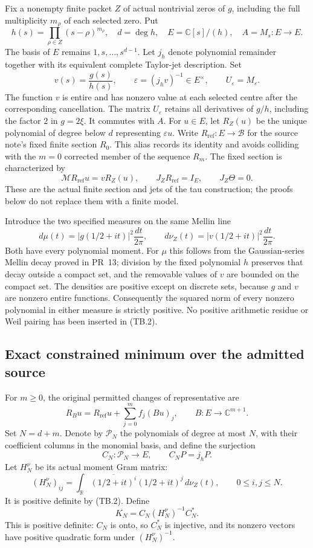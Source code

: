 Fix a nonempty finite packet \(Z\) of actual nontrivial zeros of \(g\),
including the full multiplicity \(m_\rho\) of each selected zero.  Put
\[
 h(s)=\prod_{\rho\in Z}(s-\rho)^{m_\rho},\quad
 d=\deg h,\quad E=\mathbb C[s]/(h),\quad A=M_s:E\longrightarrow E.
\]
The basis of \(E\) remains \(1,s,\ldots,s^{d-1}\).
Let \(j_h\) denote polynomial remainder together with its equivalent
complete Taylor-jet description.  Set
\[
 v(s)=\frac{g(s)}{h(s)},\qquad
 \varepsilon=(j_hv)^{-1}\in E^\times,\qquad U_\varepsilon=M_\varepsilon.
\]
The function \(v\) is entire and has nonzero value at each selected
centre after the corresponding cancellation.  The matrix
\(U_\varepsilon\) retains all derivatives of \(g/h\), including the
factor \(2\) in \(g=2\xi\).  It commutes with \(A\).
For \(u\in E\), let \(R_Z(u)\) be the unique polynomial of degree below
\(d\) representing \(\varepsilon u\).
Write \(R_{\mathrm{ref}}:E\to\mathscr B\) for the source note's
fixed finite section \(R_0\).  This alias records its identity
and avoids colliding with the \(m=0\) corrected member of the
sequence \(R_m\).  The fixed section is characterized by
\[
 \mathcal M R_{\mathrm{ref}}u=vR_Z(u),\qquad
 J_ZR_{\mathrm{ref}}=I_E,\qquad J_Z\Theta=0.
 \tag{TB.1}
\]
These are the actual finite section and jets of the tau construction;
the proofs below do not replace them with a finite model.

Introduce the two specified measures on the same Mellin line
\[
 d\mu(t)=|g(1/2+it)|^2\frac{dt}{2\pi},\qquad
 d\nu_Z(t)=|v(1/2+it)|^2\frac{dt}{2\pi}.
 \tag{TB.2}
\]
Both have every polynomial moment.  For \(\mu\) this follows from
the Gaussian-series Mellin decay proved in PR~13; division by the
fixed polynomial \(h\) preserves that decay outside a compact set,
and the removable values of \(v\) are bounded on the compact set.
The densities are positive except on discrete sets, because \(g\)
and \(v\) are nonzero entire functions.  Consequently the squared
norm of every nonzero polynomial in either measure is strictly
positive.  No positive arithmetic residue or Weil pairing has
been inserted in (TB.2).

\subsection{Exact constrained minimum over the admitted source}

For \(m\geq0\), the original permitted changes of representative are
\[
 R_Bu=R_{\mathrm{ref}}u+\sum_{j=0}^m f_j(Bu)_j,\qquad
 B:E\longrightarrow\mathbb C^{m+1}.
 \tag{TB.3}
\]
Set \(N=d+m\).  Denote by \(\mathcal P_N\) the polynomials of degree
at most \(N\), with their coefficient columns in the monomial basis,
and define the surjection
\[
 C_N:\mathcal P_N\longrightarrow E,\qquad C_NP=j_hP.
 \tag{TB.4}
\]
Let \(H_N^\nu\) be its actual moment Gram matrix:
\[
 (H_N^\nu)_{ij}
 =\int_{\mathbb R}\overline{(1/2+it)^i}(1/2+it)^j\,d\nu_Z(t),
 \qquad 0\leq i,j\leq N.
 \tag{TB.5}
\]
It is positive definite by (TB.2).  Define
\[
 K_N=C_N(H_N^\nu)^{-1}C_N^*.
 \tag{TB.6}
\]
This is positive definite: \(C_N\) is onto, so \(C_N^*\) is
injective, and its nonzero vectors have positive quadratic form
under \((H_N^\nu)^{-1}\).

